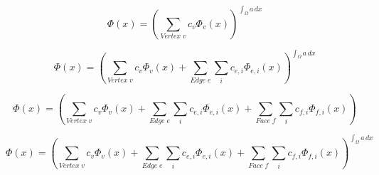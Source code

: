\documentclass{article}
\begin{document}
$$\Phi(x) = \left( \sum_{Vertex\;v} c_v \Phi_v(x)
        \right)^{\int_\Omega a \, dx}$$

$$\Phi(x) = \left( \sum_{Vertex\;v} c_v \Phi_v(x) + 
        \sum_{Edge\;e} \sum_{i} c_{e,i} \Phi_{e,i}(x)
        \right)^{\int_\Omega a \, dx}$$

$$\Phi(x) = \left( \sum_{Vertex\;v} c_v \Phi_v(x) + 
        \sum_{Edge\;e} \sum_{i} c_{e,i} \Phi_{e,i}(x) +
        \sum_{Face\;f} \sum_{i} c_{f,i} \Phi_{f,i}(x)
        \right)$$

$$\Phi(x) = \left( \sum_{Vertex\;v} c_v \Phi_v(x) + 
        \sum_{Edge\;e} \sum_{i} c_{e,i} \Phi_{e,i}(x) +
        \sum_{Face\;f} \sum_{i} c_{f,i} \Phi_{f,i}(x)
        \right)^{\int_\Omega a \, dx}$$
\end{document}
